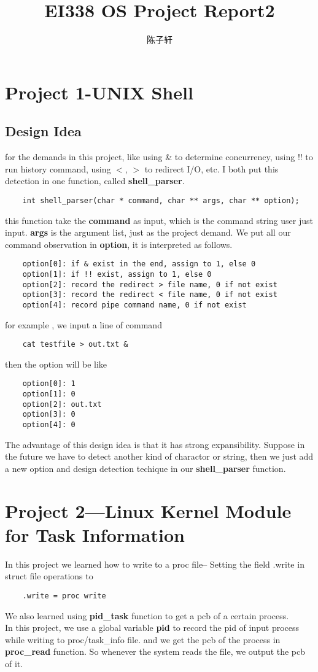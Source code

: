 \documentclass[UTF8]{ctexart}
\title{EI338 OS Project Report2}
\author{陈子轩}
\begin{document}
\maketitle
\section{Project 1-UNIX Shell}
\subsection{Design Idea}
for the demands in this project, like using \& to determine concurrency, using !! to run history command, using $<$, $>$ to redirect I/O, etc. I both put this detection in one function, called \textbf{shell\_parser}. 
\begin{verbatim}
    int shell_parser(char * command, char ** args, char ** option);
\end{verbatim} 

this function take the \textbf{command} as input, which is the command string user just input. \textbf{args} is the argument list, just as the project demand. We put all our command observation in \textbf{option}, it is interpreted as follows.
\begin{verbatim}
    option[0]: if & exist in the end, assign to 1, else 0
    option[1]: if !! exist, assign to 1, else 0
    option[2]: record the redirect > file name, 0 if not exist
    option[3]: record the redirect < file name, 0 if not exist 
    option[4]: record pipe command name, 0 if not exist 
\end{verbatim}
for example , we input a  line of command 
\begin{verbatim}
    cat testfile > out.txt &
\end{verbatim}
then the option will be like
\begin{verbatim}
    option[0]: 1
    option[1]: 0
    option[2]: out.txt
    option[3]: 0
    option[4]: 0
\end{verbatim}
The advantage of this design idea is that it has strong expansibility. Suppose in the future we have to detect another kind of charactor or string, then we just add a new option and design detection techique in our \textbf{shell\_parser} function.
\section{Project 2—Linux Kernel Module for Task Information}
In this project we learned how to write to a proc file-- Setting the field .write in struct file operations to
\begin{verbatim}
    .write = proc write
\end{verbatim} 
We also learned using \textbf{pid\_task} function to get a pcb of a certain process.\\
In this project, we use a global variable \textbf{pid} to record the pid of input process while writing to proc/task\_info file.
and we get the pcb of the process in \textbf{proc\_read} function. So whenever the system reads the file, we output the pcb of it. 
\end{document}

